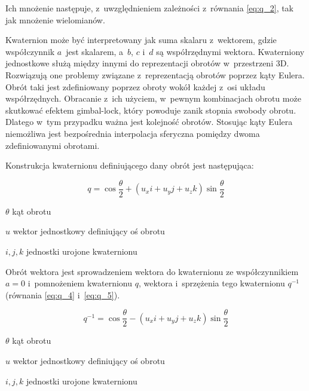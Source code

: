 Ich mnożenie następuje, z~uwzględnieniem zależności z~równania \ref{eq:q_2}, tak jak mnożenie wielomianów.

Kwaternion może być interpretowany jak suma skalaru z~wektorem, gdzie współczynnik $a$~jest skalarem, a~$b$, $c$ i~$d$ są współrzędnymi wektora. Kwaterniony jednostkowe służą między innymi do reprezentacji obrotów w~przestrzeni 3D. Rozwiązują one problemy związane z~reprezentacją obrotów poprzez kąty Eulera. Obrót taki jest zdefiniowany poprzez obroty wokół każdej z~osi układu współrzędnych. Obracanie z~ich użyciem, w~pewnym kombinacjach obrotu może skutkować efektem gimbal-lock, który powoduje zanik stopnia swobody obrotu. Dlatego w~tym przypadku ważna jest kolejność obrotów. Stosując kąty Eulera niemożliwa jest bezpośrednia interpolacja sferyczna pomiędzy dwoma zdefiniowanymi obrotami.

Konstrukcja kwaternionu definiującego dany obrót jest następująca:
\begin{samepage}
    \begin{equation}
        \label{eq:q_3}
        q = \cos{\frac{\theta}{2}} + (u_xi+u_yj+u_zk)\sin{\frac{\theta}{2}}
    \end{equation}
    \begin{eqexpl}[25mm]
        \item {$\theta$} kąt obrotu
        \item {$u$} wektor jednostkowy definiujący oś obrotu
        \item {$i, j, k$} jednostki urojone kwaternionu
    \end{eqexpl}
    \vspace{\baselineskip}
\end{samepage}

Obrót wektora jest sprowadzeniem wektora do kwaternionu ze współczynnikiem $a = 0$ i~pomnożeniem kwaternionu $q$, wektora i~sprzężenia tego kwaternionu $q^{-1}$ (równania \ref{eq:q_4} i~\ref{eq:q_5}). 

\begin{samepage}
    \begin{equation}
        \label{eq:q_4}
        q^{-1} = \cos{\frac{\theta}{2}} - (u_xi+u_yj+u_zk)\sin{\frac{\theta}{2}}
    \end{equation}
    \begin{eqexpl}[25mm]
        \item {$\theta$} kąt obrotu
        \item {$u$} wektor jednostkowy definiujący oś obrotu
        \item {$i, j, k$} jednostki urojone kwaternionu
    \end{eqexpl}
\end{samepage}

